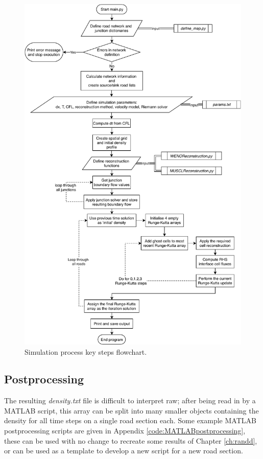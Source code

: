 	\begin{figure}
    		\centering
        		\includegraphics[trim=0 0 0 0,clip,width=\textwidth]{FlowChart.pdf}
		\caption[Development : Simulation process flowchart]{Simulation process key steps flowchart.}
		\label{fig:simflowchart}
	\end{figure}

\subsection{Postprocessing}

	The resulting \emph{density.txt} file is difficult to interpret raw; after being read in by a MATLAB script, this array can be split into many smaller objects containing the density for all time steps on a single road section each. Some example MATLAB postprocessing scripts are given in Appendix \ref{code:MATLABpostprocessing}, these can be used with no change to recreate some results of Chapter \ref{ch:randd}, or can be used as a template to develop a new script for a new road section. 